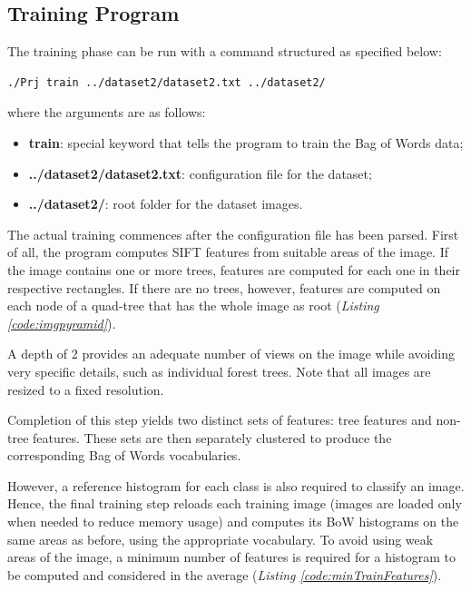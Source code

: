 \documentclass{article}
\begin{document}
\subsection{Training Program}
The training phase can be run with a command structured as specified below:
\begin{lstlisting}[style=CommandLine]
./Prj train ../dataset2/dataset2.txt ../dataset2/
\end{lstlisting}
where the arguments are as follows:
\begin{itemize}
\item \textbf{train}: special keyword that tells the program to train the Bag of Words data;
\item \textbf{../dataset2/dataset2.txt}: configuration file for the dataset;
\item \textbf{../dataset2/}: root folder for the dataset images.
\end{itemize}

The actual training commences after the configuration file has been parsed.
First of all, the program computes SIFT features from suitable areas of the image. If the image contains one or more trees, features are computed for each one in their respective rectangles. 
If there are no trees, however, features are computed on each node of a quad-tree that has the whole image as root (\textit{Listing \ref{code:imgpyramid}}). 



A depth of 2 provides an adequate number of views on the image while avoiding very specific details, such as individual forest trees.
Note that all images are resized to a fixed resolution.

Completion of this step yields two distinct sets of features: tree features and non-tree features.
These sets are then separately clustered to produce the corresponding Bag of Words vocabularies.

However, a reference histogram for each class is also required to classify an image. Hence, the final training step reloads each training image (images are loaded only when needed to reduce memory usage) and computes its BoW histograms on the same areas as before, using the appropriate vocabulary.
To avoid using weak areas of the image, a minimum number of features is required for a histogram to be computed and considered in the average (\textit{Listing \ref{code:minTrainFeatures}}).
\end{document}
